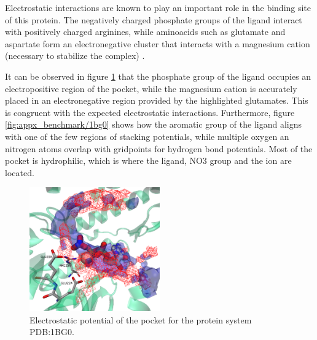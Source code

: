       Electrostatic interactions are known to play an important role in the binding site of this protein. The negatively charged phosphate groups of the ligand interact with positively charged arginines, while aminoacids such as glutamate and aspartate form an electronegative cluster that interacts with a magnesium cation (necessary to stabilize the complex) \cite{benchmark_negative_2000}.

      It can be observed in figure \ref{fig:benchmark/1bg0} that the phosphate group of the ligand occupies an electropositive region of the pocket, while the magnesium cation is accurately placed in an electronegative region provided by the highlighted glutamates. This is congruent with the expected electrostatic interactions. Furthermore, figure \ref{fig:appx_benchmark/1bg0} shows how the aromatic group of the ligand aligns with one of the few regions of stacking potentials, while multiple oxygen an nitrogen atoms overlap with gridpoints for hydrogen bond potentials. Most of the pocket is hydrophilic, which is where the ligand, NO3 group and the ion are located.

      \begin{figure}[H]
        \centering
        \includegraphics[width=0.5\textwidth]{figures/results/benchmark_prot/1bg0.png}
        \caption{\label{fig:benchmark/1bg0} Electrostatic potential of the pocket for the protein system PDB:1BG0.}
      \end{figure}
    \pagebreak

